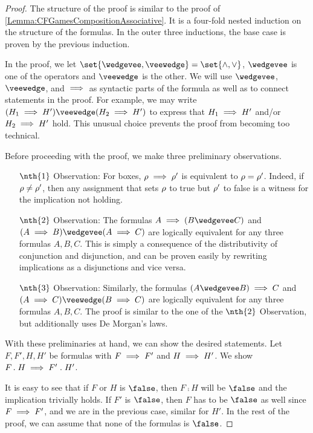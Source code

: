 \documentclass[../../diss.tex]{subfiles}
\begin{document}
\begin{proof}
    The structure of the proof is similar to the proof of \cref{Lemma:CFGamesCompositionAssociative}.
    It is a four-fold nested induction on the structure of the formulas.
    In the outer three inductions, the base case is proven by the previous induction.

    In the proof, we let $\set{ \wedgevee, \veewedge } = \set{ \wedge, \vee}$, \ie $\wedgevee$ is one of the operators and $\veewedge$ is the other.
    We will use $\wedgevee$, $\veewedge$, and $\implies$ as syntactic parts of the formula as well as to connect statements in the proof.
    For example, we may write $(H_1 \lleq H') \veewedge (H_2 \lleq H')$ to express that $H_1 \implies H'$ and/or $H_2 \implies H'$ hold.
    This unusual choice prevents the proof from becoming too technical.

    Before proceeding with the proof, we make three preliminary observations.
    \begin{itemize}
        \item[$\nth{1}$ Observation:]
            For boxes, $\tbox \lleq \tbox'$ is equivalent to $\tbox = \tbox'$.
            Indeed, if $\tbox \neq \tbox'$, then any assignment that sets $\tbox$ to true but $\tbox'$ to false is a witness for the implication not holding.
        \item[$\nth{2}$ Observation:]
            The formulas $A \lleq (B \wedgevee C)$ and  $(A \lleq B) \wedgevee (A \lleq C)$ are logically equivalent for any three formulas $A,B,C$.
            This is simply a consequence of the distributivity of conjunction and disjunction, and can be proven easily by rewriting implications as a disjunctions and vice versa.
        \item[$\nth{3}$ Observation:]
            Similarly, the formulas  $(A \wedgevee B) \lleq C$ and $(A \lleq C) \veewedge (B \lleq C)$ are logically equivalent for any three formulas $A,B,C$.
            The proof is similar to the one of the $\nth{2}$ Observation, but additionally uses De Morgan's laws.
    \end{itemize}

    With these preliminaries at hand, we can show the desired statements.
    Let $F,F',H,H'$ be formulas with $F \implies F'$ and $H \implies H'$.
    We show $F \mathrel{.} H \implies F' \mathrel{.} H'$.

    It is easy to see that if $F$ or $H$ is $\false$, then $F \comp H$ will be $\false$ and the implication trivially holds.
    If $F'$ is $\false$, then $F$ has to be $\false$ as well since $F \implies F'$, and we are in the previous case, similar for $H'$.
    In the rest of the proof, we can assume that none of the formulas is $\false$.


\end{proof}
\end{document}
